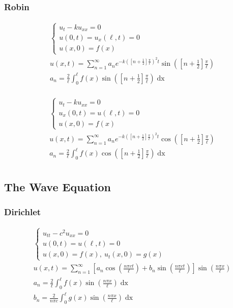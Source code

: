 \documentclass{article}
\begin{document}
\subsubsection*{Robin}
\begin{minipage}{0.5\textwidth}
\begin{gather*}
\begin{cases}
u_{t} - ku_{xx} = 0\\
u(0,t) = u_{x}(\ell,t) = 0\\
u(x,0) = f(x)
\end{cases}\\
u(x,t) = \sum_{n=1}^{\infty}a_{n}e^{-k\left(\left[n + \frac{1}{2}\right]\frac{\pi}{\ell}\right)^{2}t}\sin{\left(\left[n + \frac{1}{2}\right]\frac{\pi}{\ell}\right)}\\
a_{n} = \frac{2}{\ell}\int_{0}^{\ell}f(x)\sin{\left(\left[n + \frac{1}{2}\right]\frac{\pi}{\ell}\right)}\mathop{dx}\\
\end{gather*}
\end{minipage}
\begin{minipage}{0.5\textwidth}
\begin{gather*}
\begin{cases}
u_{t} - ku_{xx} = 0\\
u_{x}(0,t) = u(\ell,t) = 0\\
u(x,0) = f(x)
\end{cases}\\
u(x,t) = \sum_{n=1}^{\infty}a_{n}e^{-k\left(\left[n + \frac{1}{2}\right]\frac{\pi}{\ell}\right)^{2}t}\cos{\left(\left[n + \frac{1}{2}\right]\frac{\pi}{\ell}\right)}\\
a_{n} = \frac{2}{\ell}\int_{0}^{\ell}f(x)\cos{\left(\left[n + \frac{1}{2}\right]\frac{\pi}{\ell}\right)}\mathop{dx}\\
\end{gather*}
\end{minipage}


\subsection{The Wave Equation}
\subsubsection*{Dirichlet}
\begin{gather*}
\begin{cases}
u_{tt} - c^{2}u_{xx} = 0\\
u(0,t) = u(\ell,t) = 0\\
u(x,0) = f(x),\ u_{t}(x,0) = g(x)
\end{cases}\\
u(x,t) = \sum_{n=1}^{\infty}\left[a_{n}\cos{\left(\frac{n\pi c t}{\ell}\right)} + b_{n}\sin{\left(\frac{n\pi c t}{\ell}\right)}\right]\sin{\left(\frac{n\pi x}{\ell}\right)}\\
a_{n} = \frac{2}{\ell}\int_{0}^{\ell}f(x)\sin{\left(\frac{n\pi x}{\ell}\right)}\mathop{dx}\\
b_{n} = \frac{2}{n\pi c}\int_{0}^{\ell}g(x)\sin{\left(\frac{n\pi x}{\ell}\right)}\mathop{dx}\\
\end{gather*}
\end{document}
